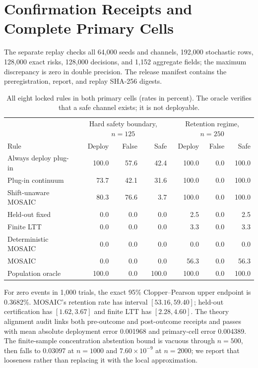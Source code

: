 \section{Confirmation Receipts and Complete Primary Cells}

The separate replay checks all 64,000 seeds and channels, 192,000 stochastic
rows, 128,000 exact risks, 128,000 decisions, and 1,152 aggregate fields; the
maximum discrepancy is zero in double precision. The release manifest contains
the preregistration, report, and replay SHA-256 digests.

\begin{table}[t]
\centering
\small
\setlength{\tabcolsep}{5.0pt}
\begin{tabular}{lrrrrrr}
\hline
& \multicolumn{3}{c}{Hard safety boundary, $n=125$}
& \multicolumn{3}{c}{Retention regime, $n=250$} \\
Rule & Deploy & False & Safe & Deploy & False & Safe \\
\hline
Always deploy plug-in & 100.0 & 57.6 & 42.4 & 100.0 & 0.0 & 100.0 \\
Plug-in continuum     &  73.7 & 42.1 & 31.6 & 100.0 & 0.0 & 100.0 \\
Shift-unaware MOSAIC  &  80.3 & 76.6 &  3.7 & 100.0 & 0.0 & 100.0 \\
Held-out fixed        &   0.0 &  0.0 &  0.0 &   2.5 & 0.0 &   2.5 \\
Finite LTT            &   0.0 &  0.0 &  0.0 &   3.3 & 0.0 &   3.3 \\
Deterministic MOSAIC  &   0.0 &  0.0 &  0.0 &   0.0 & 0.0 &   0.0 \\
MOSAIC                &   0.0 &  0.0 &  0.0 &  56.3 & 0.0 &  56.3 \\
Population oracle     & 100.0 &  0.0 &100.0 & 100.0 & 0.0 & 100.0 \\
\hline
\end{tabular}
\caption{All eight locked rules in both primary cells (rates in percent).
The oracle verifies that a safe channel exists; it is not deployable.}
\label{supp:tab:allprimary}
\end{table}

For zero events in 1,000 trials, the exact 95\% Clopper--Pearson upper endpoint
is 0.3682\%.  MOSAIC's retention rate has interval $[53.16,59.40]$; held-out
certification has $[1.62,3.67]$ and finite LTT has $[2.28,4.60]$.  The theory
alignment audit links both pre-outcome and post-outcome receipts and passes
with mean absolute deployment error 0.001968 and primary-cell error 0.004389.
The finite-sample concentration abstention bound is vacuous through $n=500$,
then falls to 0.03097 at $n=1000$ and $7.60\times10^{-9}$ at $n=2000$; we
report that looseness rather than replacing it with the local approximation.

